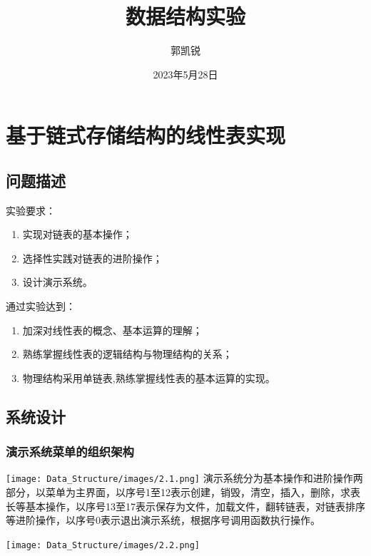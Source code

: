 \documentclass[supercite]{Experimental_Report}
\title{~~~~~~数据结构实验~~~~~~}
\author{郭凯锐}
\date{2023年5月28日}
\theoremstyle{definition}
\begin{document}
\maketitle

\clearpage


\tableofcontents[level=2]

\clearpage


\section{基于链式存储结构的线性表实现}

\subsection{问题描述}

\noindent 实验要求：
\begin{enumerate}
	\item 实现对链表的基本操作；
	\item 选择性实践对链表的进阶操作；
	\item 设计演示系统。
\end{enumerate}
通过实验达到：
\begin{enumerate}
	\item 加深对线性表的概念、基本运算的理解；
	\item 熟练掌握线性表的逻辑结构与物理结构的关系；
	\item 物理结构采用单链表,熟练掌握线性表的基本运算的实现。
\end{enumerate}
\subsection{系统设计}
\subsubsection{演示系统菜单的组织架构}
\texttt{[image: Data\_Structure/images/2.1.png]}
\vspace{-0.2cm}
\clearpage
\quad 演示系统分为基本操作和进阶操作两部分，以菜单为主界面，以序号1至12表示创建，销毁，清空，插入，删除，求表长等基本操作，以序号13至17表示保存为文件，加载文件，翻转链表，对链表排序等进阶操作，以序号0表示退出演示系统，根据序号调用函数执行操作。

\texttt{[image: Data\_Structure/images/2.2.png]}
\vspace{-0.2cm}
\end{document}
